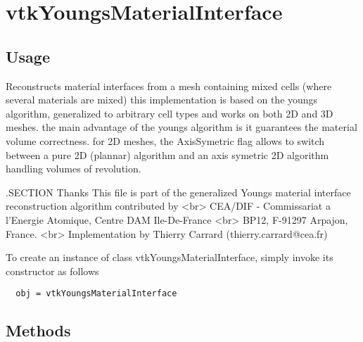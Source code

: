 \section{vtkYoungsMaterialInterface}

\subsection{Usage}

 Reconstructs material interfaces from a mesh containing mixed cells (where several materials are mixed)
 this implementation is based on the youngs algorithm, generalized to arbitrary cell types and works
 on both 2D and 3D meshes. the main advantage of the youngs algorithm is it guarantees the material volume correctness.
 for 2D meshes, the AxisSymetric flag allows to switch between a pure 2D (plannar) algorithm and an axis symetric 2D algorithm
 handling volumes of revolution.

 .SECTION Thanks
 This file is part of the generalized Youngs material interface reconstruction algorithm contributed by <br>
 CEA/DIF - Commissariat a l'Energie Atomique, Centre DAM Ile-De-France <br>
 BP12, F-91297 Arpajon, France. <br>
 Implementation by Thierry Carrard (thierry.carrard@cea.fr)

To create an instance of class vtkYoungsMaterialInterface, simply
invoke its constructor as follows
\begin{verbatim}
  obj = vtkYoungsMaterialInterface
\end{verbatim}
\subsection{Methods}


